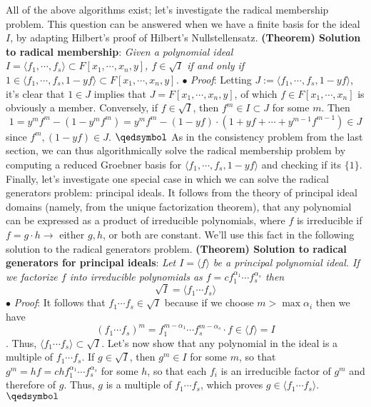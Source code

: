 \documentclass{article}
\newcommand*{\tb}{\textbf}
\newcommand*{\ti}{\textit}
\newcommand*{\n}{\newline}
\newcommand*{\nn}{\newline \newline}
\newcommand*{\Fx}{\ensuremath{F[x_1, \cdots, x_n]}}
\newcommand*{\fs}{f_1, \cdots, f_s}
\newcommand*{\lfsr}{\langle f_1, \cdots, f_s \rangle}
\begin{document}
All of the above algorithms exist; let's investigate the radical membership problem. This question can be answered when we have a finite basis for the ideal $ I $, by adapting Hilbert's proof of Hilbert's Nullstellensatz.
\nn
\tb{(Theorem) Solution to radical membership}: \ti{Given a polynomial ideal $ I = \lfsr \subset F[x_1, \cdots, x_n, y] $, $ f \in \sqrt{I} $ if and only if $ 1 \in \langle \fs, 1 - y f \rangle \subset F[x_1, \cdots, x_n, y] $.}
\n
\indent $ \bullet $ \ti{Proof}: Letting $ J := \langle \fs, 1 - y f \rangle $, it's clear that $ 1 \in J $ implies that $ J = F[x_1, \cdots, x_n, y] $, of which $ f \in \Fx $ is obviously a member. Conversely, if $ f \in \sqrt{I} $, then $ f^m \in I \subset J $ for some $ m $. Then
$$ 1 = y^m f^m - (1 - y^m f^m) = y^m f^m - (1 - y f) \cdot (1 + y f + \cdots + y^{m - 1} f^{m - 1}) \in J $$
since $ f^m, (1 - y f) \in J $. $ \qedsymbol $
\nn
As in the consistency problem from the last section, we can thus algorithmically solve the radical membership problem by computing a reduced Groebner basis for $ \langle \fs, 1 - y f \rangle $ and checking if its $ \{ 1 \} $. Finally, let's investigate one special case in which we can solve the radical generators problem: principal ideals. It follows from the theory of principal ideal domains (namely, from the unique factorization theorem), that any polynomial can be expressed as a product of irreducible polynomials, where $ f $ is irreducible if $ f = g \cdot h \rightarrow $ either $ g, h $, or both are constant. We'll use this fact in the following solution to the radical generators problem.
\nn
\tb{(Theorem) Solution to radical generators for principal ideals}: \ti{Let $ I = \langle f \rangle $ be a principal polynomial ideal. If we factorize $ f $ into irreducible polynomials as $ f = c f_1^{\alpha_1} \cdots f_s^{\alpha_s} $ then}
$$ \sqrt{I} = \langle f_1 \cdots f_s \rangle $$
\indent $ \bullet $ \ti{Proof}: It follows that $ f_1 \cdots f_s \in \sqrt{I} $ because if we choose $ m > \max \alpha_i $ then we have
$$ (f_1 \cdots f_s)^m = f_1^{m - \alpha_1} \cdots f_s^{m - \alpha_s} \cdot f \in \langle f \rangle = I $$. Thus, $ \langle f_1 \cdots f_s \rangle \subset \sqrt{I} $.
Let's now show that any polynomial in the ideal is a multiple of $ f_1 \cdots f_s $. If $ g \in \sqrt{I} $, then $ g^m \in I $ for some $ m $, so that $ g^m = h f = c h f_1^{\alpha_1} \cdots f_s^{\alpha_s} $ for some $ h $, so that each $ f_i $ is an irreducible factor of $ g^m $ and therefore of $ g $. Thus, $ g $ is a multiple of $ f_1 \cdots f_s $, which proves $ g \in \langle f_1 \cdots f_s \rangle $. $ \qedsymbol $
\end{document}
